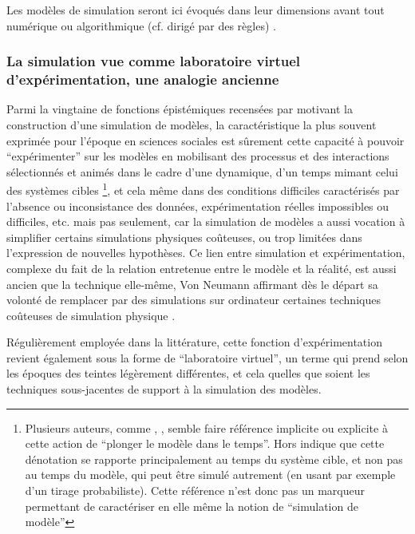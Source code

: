 Les modèles de simulation seront ici évoqués dans leur dimensions avant tout numérique ou algorithmique (cf. dirigé par des règles) \autocite[36-38]{Varenne2013}.

\subsubsection{La simulation vue comme laboratoire virtuel d'expérimentation, une analogie ancienne}
\label{ssec:labo_virtuelle}

Parmi la vingtaine de fonctions épistémiques recensées par \textcite[14-23]{Varenne2013} motivant la construction d'une simulation de modèles, la caractéristique la plus souvent exprimée pour l'époque en sciences sociales est sûrement cette capacité à pouvoir \enquote{expérimenter} sur les modèles en mobilisant des processus et des interactions sélectionnés et animés dans le cadre d'une dynamique, d'un temps mimant celui des systèmes cibles \footnote{Plusieurs auteurs, comme \autocite[462]{Gullahorn1965}, \autocite[296]{Doran1970}, \autocite[294-295]{Batty1976} semble faire référence implicite ou explicite à cette action de \enquote{plonger le modèle dans le temps}. Hors \autocite[31]{Varenne2013} indique que cette dénotation se rapporte principalement au temps du système cible, et non pas au temps du modèle, qui peut être simulé autrement (en usant par exemple d'un tirage probabiliste). Cette référence n'est donc pas un marqueur permettant de caractériser en elle même la notion de \enquote{simulation de modèle}}, et cela même dans des conditions difficiles caractérisés par l'absence ou inconsistance des données, expérimentation réelles impossibles ou difficiles, etc. mais pas seulement, car la simulation de modèles a aussi vocation à simplifier certains simulations physiques coûteuses, ou trop limitées dans l'expression de nouvelles hypothèses. Ce lien entre simulation et expérimentation, complexe du fait de la relation entretenue entre le modèle et la réalité, est aussi ancien que la technique elle-même, Von Neumann affirmant dès le départ sa volonté de remplacer par des simulations sur ordinateur certaines techniques coûteuses de simulation physique \autocite[15]{Winsberg2013}.

Régulièrement employée dans la littérature, cette fonction d’expérimentation revient également sous la forme de \enquote{laboratoire virtuel}, un terme qui prend selon les époques des teintes légèrement différentes, et cela quelles que soient les techniques sous-jacentes de support à la simulation des modèles.

